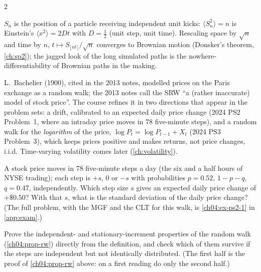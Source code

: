 \begin{paracol}{2}
\begin{intuition}[Diffusion]
$S_n$ is the position of a particle receiving independent unit kicks: $\langle S_n^2\rangle=n$ is
Einstein's $\langle x^2\rangle=2Dt$ with $D=\tfrac12$ (unit step, unit time). Rescaling space by
$\sqrt n$ and time by $n$, $t\mapsto S_{\lfloor nt\rfloor}/\sqrt n$ converges to Brownian motion
(Donsker's theorem, \cref{ch:sp2}); the jagged look of the long simulated paths is the nowhere-differentiability
of Brownian paths in the making.
\end{intuition}

\begin{finance}
L.~Bachelier (1900), cited in the 2013 notes, modelled prices on the Paris exchange as a random walk;
the 2013 notes call the SRW ``a (rather inaccurate) model of stock price''. The course refines it in
two directions that appear in the problem sets: a drift, calibrated to an expected daily price change
(2024 PS2 Problem~1, where an intraday price moves in 78 five-minute steps), and a random walk for
the \emph{logarithm} of the price, $\log P_t=\log P_{t-1}+X_t$ (2024 PS3 Problem~3), which keeps prices
positive and makes returns, not price changes, i.i.d. Time-varying volatility comes later
(\cref{ch:volatility}).
\end{finance}

\begin{exercise}\label{ch04:ex-ps2-1-short}
A stock price moves in 78 five-minute steps a day (the six and a half hours of NYSE trading); each step is $+s$, $0$ or
$-s$ with probabilities $p=0.52$, $1-p-q$, $q=0.47$, independently. Which step size $s$ gives an expected daily price
change of $+\$0.50$? With that $s$, what is the standard deviation of the daily price change? (The full problem, with
the MGF and the CLT for this walk, is \cref{ch04:ex-ps2-1} in \cref{app:exam}.)
\end{exercise}

\begin{exercise}
Prove the independent- and stationary-increment properties of the random walk (\cref{ch04:prop-rw}) directly from
the definition, and check which of them survive if the steps are independent but not identically distributed.
(The first half is the proof of \cref{ch04:prop-rw} above: on a first reading do only the second half.)
\end{exercise}


\end{paracol}
